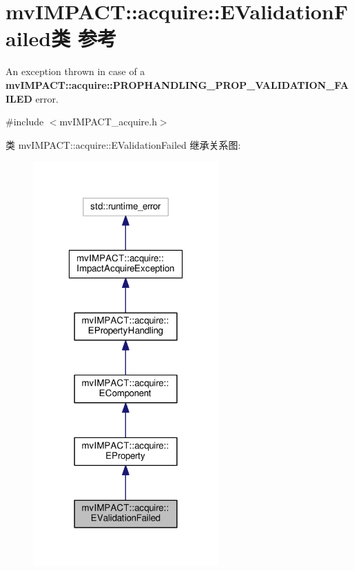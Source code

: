 \hypertarget{classmv_i_m_p_a_c_t_1_1acquire_1_1_e_validation_failed}{\section{mv\+I\+M\+P\+A\+C\+T\+:\+:acquire\+:\+:E\+Validation\+Failed类 参考}
\label{classmv_i_m_p_a_c_t_1_1acquire_1_1_e_validation_failed}
}


An exception thrown in case of a {\bfseries mv\+I\+M\+P\+A\+C\+T\+::acquire\+::\+P\+R\+O\+P\+H\+A\+N\+D\+L\+I\+N\+G\+\_\+\+P\+R\+O\+P\+\_\+\+V\+A\+L\+I\+D\+A\+T\+I\+O\+N\+\_\+\+F\+A\+I\+L\+E\+D} error.  




{\ttfamily \#include $<$mv\+I\+M\+P\+A\+C\+T\+\_\+acquire.\+h$>$}



类 mv\+I\+M\+P\+A\+C\+T\+:\+:acquire\+:\+:E\+Validation\+Failed 继承关系图\+:
\nopagebreak
\begin{figure}[H]
\begin{center}
\leavevmode
\includegraphics[width=202pt]{classmv_i_m_p_a_c_t_1_1acquire_1_1_e_validation_failed__inherit__graph}
\end{center}
\end{figure}


